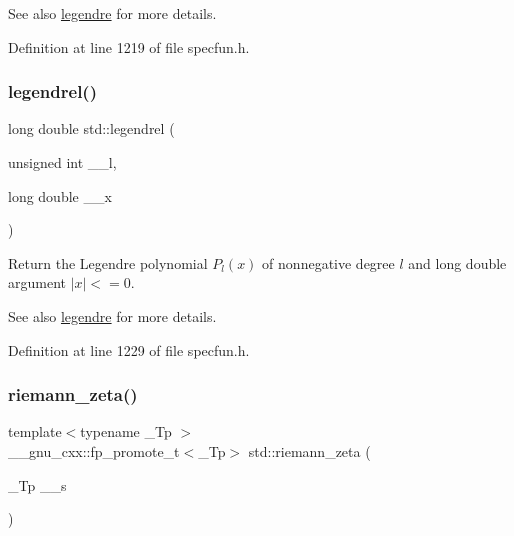 \begin{DoxySeeAlso}{See also}
\hyperlink{group__cxx17__math__spec__func_gad06811f4e139b0ba84235c1f0d34d86e}{legendre} for more details. 
\end{DoxySeeAlso}


Definition at line 1219 of file specfun.\+h.

\mbox{\label{group__cxx17__math__spec__func_ga1b39bc22e3cc4860d08eb54099460391}} 
\subsubsection{\texorpdfstring{legendrel()}{legendrel()}}
{\footnotesize\ttfamily long double std\+::legendrel (\begin{DoxyParamCaption}\item[{unsigned int}]{\+\_\+\+\_\+l,  }\item[{long double}]{\+\_\+\+\_\+x }\end{DoxyParamCaption})\hspace{0.3cm}{\ttfamily [inline]}}

Return the Legendre polynomial $ P_l(x) $ of nonnegative degree $ l $ and {\ttfamily long double} argument $ |x| <= 0 $.

\begin{DoxySeeAlso}{See also}
\hyperlink{group__cxx17__math__spec__func_gad06811f4e139b0ba84235c1f0d34d86e}{legendre} for more details. 
\end{DoxySeeAlso}


Definition at line 1229 of file specfun.\+h.

\mbox{\label{group__cxx17__math__spec__func_gac4ef9d52ee583c77937c3a420b7c72ca}} 
\subsubsection{\texorpdfstring{riemann\+\_\+zeta()}{riemann\_zeta()}}
{\footnotesize\ttfamily template$<$typename \+\_\+\+Tp $>$ \\
\+\_\+\+\_\+gnu\+\_\+cxx\+::fp\+\_\+promote\+\_\+t$<$\+\_\+\+Tp$>$ std\+::riemann\+\_\+zeta (\begin{DoxyParamCaption}\item[{\+\_\+\+Tp}]{\+\_\+\+\_\+s }\end{DoxyParamCaption})\hspace{0.3cm}{\ttfamily [inline]}}

